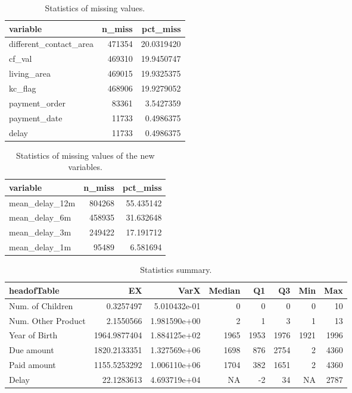 \documentclass[
]{article}
\begin{document}
\begin{table}

\caption{\label{tab:Missing-stat}Statistics of missing values.}
\centering
\begin{tabular}[t]{l|r|r}
\hline
variable & n\_miss & pct\_miss\\
\hline
different\_contact\_area & 471354 & 20.0319420\\
\hline
cf\_val & 469310 & 19.9450747\\
\hline
living\_area & 469015 & 19.9325375\\
\hline
kc\_flag & 468906 & 19.9279052\\
\hline
payment\_order & 83361 & 3.5427359\\
\hline
payment\_date & 11733 & 0.4986375\\
\hline
delay & 11733 & 0.4986375\\
\hline
\end{tabular}
\end{table}

\begin{table}

\caption{\label{tab:miss-statnew}Statistics of missing values of the new variables.}
\centering
\begin{tabular}[t]{l|r|r}
\hline
variable & n\_miss & pct\_miss\\
\hline
mean\_delay\_12m & 804268 & 55.435142\\
\hline
mean\_delay\_6m & 458935 & 31.632648\\
\hline
mean\_delay\_3m & 249422 & 17.191712\\
\hline
mean\_delay\_1m & 95489 & 6.581694\\
\hline
\end{tabular}
\end{table}

\begin{table}

\caption{\label{tab:Stats}Statistics summary.}
\centering
\begin{tabular}[t]{l|r|r|r|r|r|r|r}
\hline
headofTable & EX & VarX & Median & Q1 & Q3 & Min & Max\\
\hline
Num. of Children & 0.3257497 & 5.010432e-01 & 0 & 0 & 0 & 0 & 10\\
\hline
Num. Other Product & 2.1550566 & 1.981590e+00 & 2 & 1 & 3 & 1 & 13\\
\hline
Year of Birth & 1964.9877404 & 1.884125e+02 & 1965 & 1953 & 1976 & 1921 & 1996\\
\hline
Due amount & 1820.2133351 & 1.327569e+06 & 1698 & 876 & 2754 & 2 & 4360\\
\hline
Paid amount & 1155.5253292 & 1.006110e+06 & 1704 & 382 & 1651 & 2 & 4360\\
\hline
Delay & 22.1283613 & 4.693719e+04 & NA & -2 & 34 & NA & 2787\\
\hline
\end{tabular}
\end{table}
\end{document}
